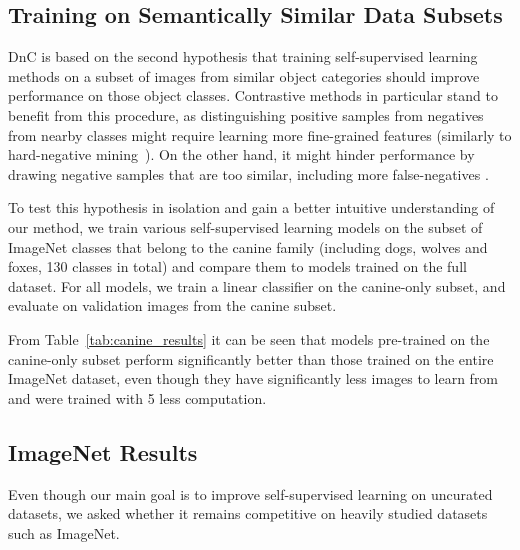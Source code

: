 \documentclass[final]{cvpr}
\begin{document}
\subsection{Training on Semantically Similar Data Subsets}
\label{section:canine_experiments}
DnC is based on the second hypothesis that training self-supervised learning methods on a subset of images from similar object categories should improve performance on those object classes. 
Contrastive methods in particular stand to benefit from this procedure, as distinguishing positive samples from negatives from nearby classes might require learning more fine-grained features 
(similarly to hard-negative mining~\cite{schroff2015facenet,kalantidis2020hard}). On the other hand, it might hinder performance by drawing negative samples that are too similar, including more false-negatives \cite{chuang2020debiased}. 

To test this hypothesis in isolation and gain a better intuitive understanding of our method, we train various self-supervised learning models on the subset of ImageNet classes that belong to the canine family (including dogs, wolves and foxes, 130 classes in total) and compare them to models trained on the full dataset. For all models, we train a linear classifier on the canine-only subset, and evaluate on validation images from the canine subset. 


From Table~\ref{tab:canine_results} it can be seen that models pre-trained on the canine-only subset perform significantly better than those trained on the entire ImageNet dataset, even though they have significantly less images to learn from and were trained with 5 less computation.

\subsection{ImageNet Results}
Even though our main goal is to improve self-supervised learning on uncurated datasets, we asked whether it remains competitive on heavily studied datasets such as ImageNet.
\end{document}
